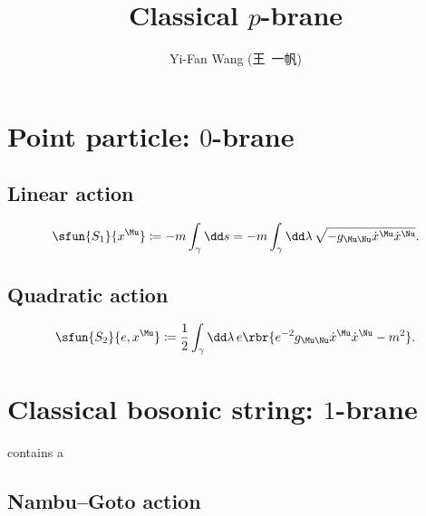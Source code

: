 \documentclass[a4paper,11pt]{article}
\title{Classical $p$-brane}
\author{Yi-Fan Wang (王\ 一帆)}
\begin{document}
\maketitle

\section{Point particle: $0$-brane}
\label{sec:pnt-ptc}

\subsection{Linear action}
\label{sec:pnt-ptc-lin}

\begin{align}
\sfun{S_1}{x^{\Mu}} \coloneqq -m \int_{\gamma} \dd s = 
-m \int_{\gamma} \dd\lambda\, \sqrt{-g_{\Mu\Nu}
	\dot{x}^{\Mu} \dot{x}^{\Nu} }.
\end{align}

\subsection{Quadratic action}
\label{sec:pnt-ptc-qua}

\begin{align}
\sfun{S_2}{e, x^{\Mu}} \coloneqq \frac{1}{2} \int_{\gamma} \dd\lambda\, e
\rbr{e^{-2} g_{\Mu\Nu} \dot{x}^{\Mu} \dot{x}^{\Nu} - m^2}.
\end{align}


\section{Classical bosonic string: $1$-brane}
\label{sec:bos-str}

\cite{Johnson2000} contains a 

\subsection{Nambu--Goto action}
\label{sec:bos-str-nam}
\end{document}
